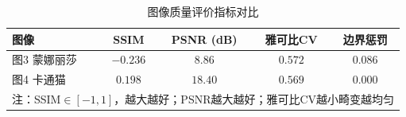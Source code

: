\begin{table}[H]
\centering
\caption{图像质量评价指标对比}\label{tab:image_metrics}
\begin{tabular}{lcccc}
\toprule
图像 & SSIM & PSNR (dB) & 雅可比CV & 边界惩罚\\
\midrule
图3 蒙娜丽莎 & $-0.236$ & $8.86$ & $0.572$ & $0.086$\\
图4 卡通猫   & $0.198$  & $18.40$ & $0.569$ & $0.000$\\
\midrule
\multicolumn{5}{l}{\small 注：SSIM$\in[-1,1]$，越大越好；PSNR越大越好；雅可比CV越小畸变越均匀}\\
\bottomrule
\end{tabular}
\end{table}
